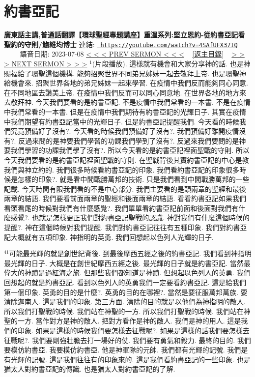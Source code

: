 \documentclass{book}
\begin{document}
\section{約書亞記}
\label{sec:4SAfUFX37IQ}
\textbf{廣東話主講,普通話翻譯【環球聖經專題講座】重溫系列:堅立恩約-從約書亞記看聖約的守則/鮑維均博士}
\newline
\newline
連結: \href{https://youtube.com/watch?v=4SAfUFX37IQ}{\texttt{ https://youtube.com/watch?v=4SAfUFX37IQ}} ~~~~ 語音日期: 2023-07-08 
\newline
\newline
\hyperref[sec:SwgE3Jqj0fE]{\small{< < < PREV SERMON < < <}}
~
\hyperref[sec:index]{\small{[返主目錄]}}
~
\hyperref[sec:U9kQXTUUjvA]{\small{> > > NEXT SERMON > > >}}
\newline
\newline
$^{1}$(片段播放).
這樣就有機會和大家分享神的話.
也是神賜福給了環聖這個機構.
能夠招聚世界不同弟兄姊妹一起去敬拜上帝.
也是環聖神給機會來.
招聚世界各地的弟兄姊妹一起來學習.
在疫情中我們反而能夠同心同意.
在不同地區去讚美上帝.
在疫情中我們反而可以同心同意地.
在世界各地的地方來去敬拜神.
今天我們要看的是約書亞記.
不是疫情中我們常看的一本書.
不是在疫情中我們常看的一本書.
但是在疫情中我們期待有約書亞記的光輝日子.
其實在疫情中我們期望有約書亞記當中的光輝日子.
但是約書亞記提醒我們.
今天看的時候我們究竟預備好了沒有?.
今天看的時候我們預備好了沒有?.
我們預備好離開疫情沒有?.
反過來問的是神要我們學習的功課我們學到了沒有?.
反過來我們要問的是神要我們學習的功課我們學了沒有?.
所以今天看的是約書亞記裡面聖戰的守則.
所以今天我們要看的是約書亞記裡面聖戰的守則.
在聖戰背後其實約書亞記的中心是教我們與神立約的.
我們很多時候看約書亞記的印象.
我們看約書亞記的印象很多時候是怎樣的印象?.
就是看中間戰勝萬邦的技術.
只是我們看到中間戰勝萬邦的一些記載.
今天時間有限我們看的不是中心部分.
我們主要看的是頭兩章的聖經和最後兩章的結語.
我們要看前面兩章的聖經和後面兩章的結語.
看看約書亞記如果我們看頭看尾的時候對我們有什麼感覺?.
我們單單看約書亞記前面和後面對我們有什麼感覺?.
也就是怎樣更正我們對約書亞記聖戰的認識.
神對我們有什麼這個時候的提醒?.
神在這個時候對我們提醒.
我們對約書亞記往往有五種印象.
我們對約書亞記大概就有五項印象.
神指明的英勇.
我們回想起以色列人光輝的日子.

$^{41}$可能最光輝的就是創世紀背後.
到最後摩西五經之後的約書亞記.
我們看到神指明最光輝的日子.
大概是在創世紀摩西五經之後.
最光輝的日子就是約書亞記.
當然最偉大的神蹟是過紅海之旅.
但那些我們都知道是神蹟.
但想起以色列人的英勇.
我們回想起的就是約書亞記.
看到以色列人的英勇我們一定要看約書亞記.
這是給我們第一個印象.
英勇的目的是什麼?.
英勇的目的在哪裡?.
當然是要征服萬邦萬族.
要清除迦南人.
這是我們的印象.
第三方面.
清除的目的就是以他們為神指明的敵人.
所以我們打聖戰的時候.
我們站在神聖的一方.
所以我們打聖戰的時候.
我們站在神聖的一方.
當作對方是神的敵人.
把對方看作是神的敵人.
我們是神的用人.
這是我們的印象.
如果是這樣的時候我們要怎樣去征戰呢?.
如果是這樣的話我們要怎樣去征戰呢?.
我們要剛強壯膽去打一場好的仗.
我們要有勇氣和毅力.
最終的目的.
我們要模仿約書亞.
我要模仿約書亞.
他是神軍隊的元帥.
我們都有光輝的記號.
我們是有光輝的記號.
這是我們往往有的印象來的.
這是我們看約書亞記的一些印象.
也是猶太人對約書亞記的傳識.
也是猶太人對約書亞記的了解.
\end{document}

